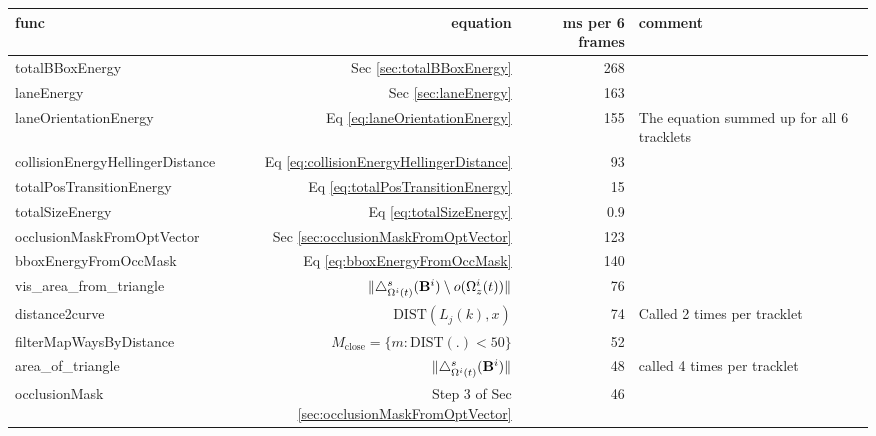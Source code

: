 \documentclass[10pt,twocolumn,letterpaper]{article}
\begin{document}
\begin{table}
  \begin{tabular}{|l|r|r|l|}
    \hline
    func            & equation                      & ms per 6 frames &
    comment \\
    \hline
    totalBBoxEnergy & Sec \ref{sec:totalBBoxEnergy} & 268 & \\
    laneEnergy      & Sec \ref{sec:laneEnergy}      & 163 & \\
    laneOrientationEnergy & Eq \eqref{eq:laneOrientationEnergy} & 155 & The
    equation summed up for all 6 tracklets\\
    collisionEnergyHellingerDistance & Eq 
    \eqref{eq:collisionEnergyHellingerDistance} & 93  & \\
    totalPosTransitionEnergy & Eq \eqref{eq:totalPosTransitionEnergy} & 15 & \\
    totalSizeEnergy & Eq \eqref{eq:totalSizeEnergy} & 0.9 & \\

    \hline
    occlusionMaskFromOptVector & Sec \ref{sec:occlusionMaskFromOptVector} &
    123 &
    \\
    bboxEnergyFromOccMask & Eq \eqref{eq:bboxEnergyFromOccMask} & 140 &  \\
    vis\_area\_from\_triangle & $\|\triangle^{s}_{\Omega^{i}(t)}(\mathbf{B}^{i}) \setminus
    o({\Omega_z^{i}(t)})\|$ & 76 & \\
    \hline
    distance2curve & $\text{DIST}(L_j(k), x)$ & 74 & Called 2 times per
    tracklet \\
    filterMapWaysByDistance & $M_{\text{close}} = \{m : \text{DIST}(.) < 50\} $ & 52 & \\
    area\_of\_triangle & $\|\triangle^{s}_{\Omega^{i}(t)}(\mathbf{B}^{i})\|$ & 48 & called 4 times per
    tracklet \\
    occlusionMask & Step 3 of Sec \ref{sec:occlusionMaskFromOptVector} & 46 &
    \\
    \hline
  \end{tabular}


\end{table}
\end{document}
